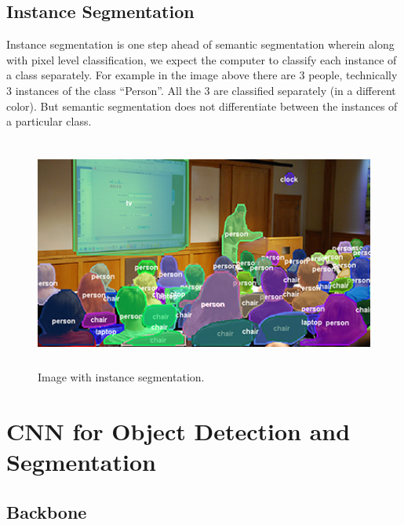 \subsection{
Instance Segmentation
}
Instance segmentation is one step ahead of semantic segmentation wherein along with pixel level classification, we expect the computer to classify each instance of a class separately. For example in the image above there are 3 people, technically 3 instances of the class “Person”. All the 3 are classified separately (in a different color). But semantic segmentation does not differentiate between the instances of a particular class.
\begin{figure}[H]
  \centering
  \includegraphics[height=3in]{images/instance.png}
   \caption{Image with instance segmentation.}
\end{figure}

\section{CNN for Object Detection and  Segmentation }

\subsection{Backbone}
